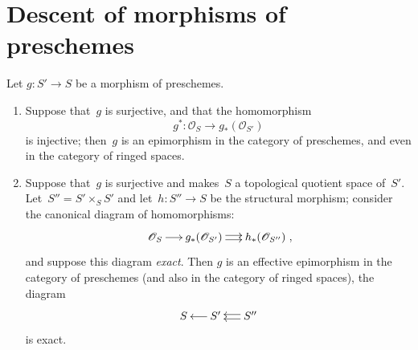 \section{Descent of morphisms of preschemes}
\label{VIII.5}

\begin{proposition}
\label{VIII.5.1}
Let $g\colon S'\to S$ be a morphism of preschemes.
\begin{enumerate}
\item[a)] Suppose that~$g$ is surjective, and that the homomorphism
$$
g^*\colon \mathcal{O}_{S}\to g_*(\mathcal{O}_{S'})
$$
is injective; then~$g$ is an epimorphism in the category
of preschemes, and even in the category of ringed
spaces.
\item[b)] Suppose that~$g$ is surjective and makes~$S$ a topological
quotient space of~$S'$. Let~$S''=S'\times_{S}S'$ and
let~$h\colon S''\to S$ be the structural morphism; consider the
canonical diagram of homomorphisms:
$$
\xymatrix@C=.5cm{\mathcal{O}_{S} \ar[r] &
g_*(\mathcal{O}_{S'})\ar@<2pt>[r]\ar@<-2pt>[r] &
h_*(\mathcal{O}_{S''})}\quoi,
$$
and suppose this diagram \emph{exact}. Then $g$ is an
effective epimorphism
in the category of preschemes (and also in the
category of ringed spaces), \ie the diagram
$$
\xymatrix@C=.5cm{S & S'\ar[l] & S''\ar@<2pt>[l]\ar@<-2pt>[l]}
$$
is exact.
\end{enumerate}
\end{proposition}

